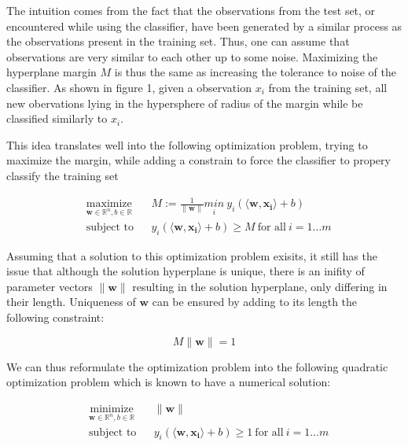 The intuition comes from the fact that the observations from the test set, or encountered while using the classifier, have been generated by a similar process as the observations present in the training set. Thus, one can assume that observations are very similar to each other up to some noise. Maximizing the hyperplane margin
$M$ is thus the same as increasing the tolerance to noise of the classifier. As shown in figure 1, given a observation $x_i$ from the training set, all new obervations lying in the hypersphere of radius of the margin while be classified similarly to $x_i$.


This idea translates well into the following optimization problem, trying to maximize the margin, while adding a constrain to force the classifier to propery classify the training set

\begin{equation}
  \begin{aligned}
    &\underset{\mathbf{w} \in \mathbb{R}^n, b \in \mathbb{R}} {\text{maximize}}
    & & M := \frac{1}{\|\mathbf{w}\|} \underset{i} {min}\ 
    y_i(\langle\mathbf{w},\mathbf{x_i}\rangle + b)\\
    &\text{subject to}
    & &y_i(\langle\mathbf{w},\mathbf{x_i}\rangle + b) \ge M\ \text{for all}\ i = 1 \dotsc m
  \end{aligned}
\end{equation}

Assuming that a solution to this optimization problem exisits, it still has the issue that although the solution hyperplane is unique, there is an inifity of parameter vectors $\|\mathbf{w}\|$ resulting in the solution hyperplane, only differing in their length. Uniqueness of $\mathbf{w}$ can be ensured by adding to its length the following constraint:

$$M\|\mathbf{w}\| = 1$$

We can thus reformulate the optimization problem into the following quadratic optimization problem which is known to have a numerical solution:

\begin{equation}
  \begin{aligned}
    &\underset{\mathbf{w} \in \mathbb{R}^n, b \in \mathbb{R}} {\text{minimize}}
    & &\|\mathbf{w}\|\\
    &\text{subject to}
    & &y_i(\langle\mathbf{w},\mathbf{x_i}\rangle + b) \ge 1\ \text{for all}\ i = 1 \dotsc m
  \end{aligned}
\end{equation}


